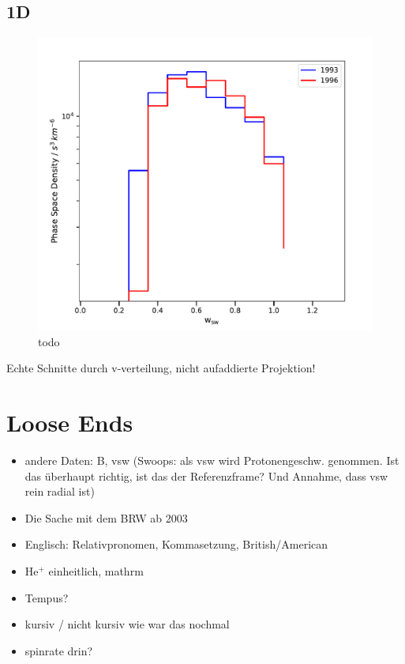 \subsection{1D}

\begin{figure}[h]
	\includegraphics[width=.8\textwidth]{Figures/1D.pdf}
	\centering
	\caption{todo}
	\label{fig:todo}
\end{figure}

Echte Schnitte durch v-verteilung, nicht aufaddierte Projektion!
%
%
%
\clearpage
\section{Loose Ends}
\begin{itemize}
	\item andere Daten: B, vsw (Swoops: als vsw wird Protonengeschw. genommen. Ist das überhaupt richtig, ist das der Referenzframe? Und Annahme, dass vsw rein radial ist)
	\item Die Sache mit dem BRW ab 2003
	\item Englisch: Relativpronomen, Kommasetzung, British/American
	\item $\mathrm{He^{+}}$ einheitlich, mathrm
	\item Tempus?
	\item kursiv / nicht kursiv wie war das nochmal
	\item spinrate drin?
\end{itemize}
